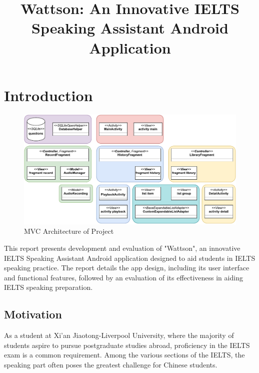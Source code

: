 \documentclass[conference,10pt,letterpaper]{IEEEtran}
\begin{document}
	
	\title{Wattson: An Innovative IELTS Speaking Assistant Android Application}
	
	\author{
	}
	\maketitle
	
	\pagestyle{fancy} %
	\fancyhead[RO,R]{\today}
	\fancyfoot[LO,L]{}
	\fancyfoot[CO,C]{\thepage}
	\fancyfoot[RO,R]{}
	\renewcommand{\headrulewidth}{0.4pt}
	\renewcommand{\footrulewidth}{0.4pt}
	
	\section{Introduction}
	\begin{figure}[b]
		\centering
		\includegraphics[width=6.2in]{src/all-classes.pdf}
		\caption{MVC Architecture of Project}
		\label{fig:all_classes}
	\end{figure}
	
	This report presents development and evaluation of "Wattson", an innovative IELTS Speaking Assistant Android application designed to aid students in IELTS speaking practice. The report details the app design, including its user interface and functional features, followed by an evaluation of its effectiveness in aiding IELTS speaking preparation. 
	
	\subsection{Motivation}
	As a student at Xi'an Jiaotong-Liverpool University, where the majority of students aspire to pursue postgraduate studies abroad, proficiency in the IELTS exam is a common requirement. Among the various sections of the IELTS, the speaking part often poses the greatest challenge for Chinese students.
	
\end{document}
